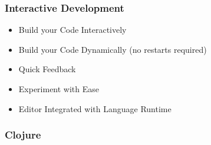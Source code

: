 \documentclass{beamer}
\begin{document}
\begin{frame}
  \frametitle{Interactive Development}
  \begin{itemize}
  \item Build your Code Interactively
  \item Build your Code Dynamically (no restarts required)
  \item Quick Feedback
  \item Experiment with Ease
  \item Editor Integrated with Language Runtime
  \end{itemize}
  \vspace{4 cm}
  \begin{tiny}
  \href {https://www.youtube.com/watch?v=gIoadGfm5T8}
    {\color {blue}{REPL Driven Development}}
  \end{tiny}
  
\end{frame}

\begin{frame}
  \frametitle{Clojure}

\end{frame}

\end{document}
